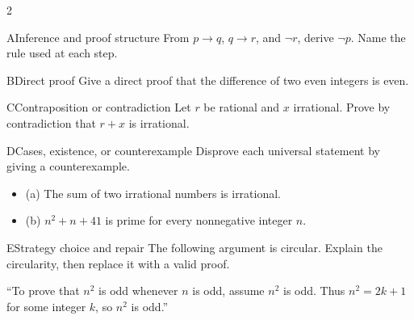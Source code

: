 \documentclass[9pt]{extarticle}
\begin{document}
\begin{multicols}{2}
\begin{CoreProblem}{A}{Inference and proof structure}
From $p\to q$, $q\to r$, and $\neg r$, derive $\neg p$. Name the rule used at
each step.
\end{CoreProblem}
\begin{CoreProblem}{B}{Direct proof}
Give a direct proof that the difference of two even integers is even.
\end{CoreProblem}
\begin{CoreProblem}{C}{Contraposition or contradiction}
Let $r$ be rational and $x$ irrational. Prove by contradiction that $r+x$ is irrational.
\end{CoreProblem}
\columnbreak
\begin{CoreProblem}{D}{Cases, existence, or counterexample}
Disprove each universal statement by giving a counterexample.
\begin{itemize}
  \item (a) The sum of two irrational numbers is irrational.
  \item (b) $n^2+n+41$ is prime for every nonnegative integer $n$.
\end{itemize}
\end{CoreProblem}
\begin{CoreProblem}{E}{Strategy choice and repair}
The following argument is circular. Explain the circularity, then replace it with a valid proof.

``To prove that $n^2$ is odd whenever $n$ is odd, assume $n^2$ is odd. Thus
$n^2=2k+1$ for some integer $k$, so $n^2$ is odd.''
\end{CoreProblem}
\end{multicols}
\CoreWorkArea
\FormBreak
{}
\end{document}
